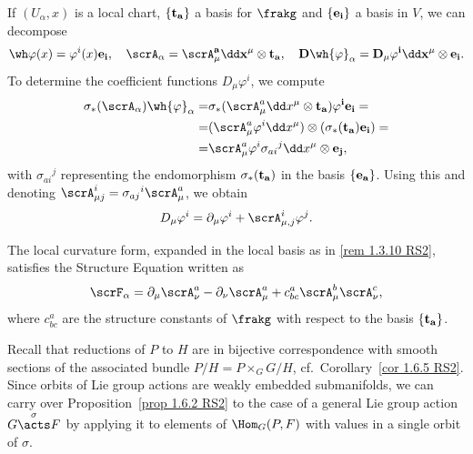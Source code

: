 \begin{rem}\label{rem 1.4.14 RS2}
    If $(U_\alpha,x)$ is a local chart, $\{\bf{t}_a\}$ a basis for $\frakg$ and $\{\bf{e}_i\}$ a basis in $V$, we can decompose
    \[\wh\varphi(x)=\varphi^i(x)\bf{e}_i,\quad \scrA_\alpha=\scrA_\mu^a\dd x^\mu\otimes \bf{t}_a,\quad D\wh{\varphi}_\alpha=D_\mu \varphi^i\dd x^\mu\otimes \bf{e}_i.\]
    To determine the coefficient functions $D_\mu\varphi^i$, we compute
    \begin{align}
        \sigma_\ast(\scrA_\alpha)\wh{\varphi}_\alpha=&\sigma_\ast(\scrA_\mu^a\dd x^\mu\otimes\bf{t}_a)\varphi^i\bf{e}_i=\\
        =&(\scrA_\mu^a\varphi^i\dd x^\mu)\otimes(\sigma_\ast(\bf{t}_a)\bf{e}_i)=\\
        =&\scrA_\mu^a\varphi^i\sigma_{ai}{}^j\dd x^\mu\otimes \bf{e}_j,
    \end{align}
    with $\sigma_{ai}{}^j$ representing the endomorphism $\sigma_\ast(\bf{t}_a)$ in the basis $\{\bf{e}_a\}$. Using this and denoting $\scrA_{\mu j}^i=\sigma_{aj}{}^i\scrA_\mu^a$, we obtain 
    \[D_\mu\varphi^i=\partial_\mu\varphi^i+\scrA_{\mu,j}^i \varphi^j.\]
\end{rem}

\begin{rem}
    The local curvature form, expanded in the local basis as in \ref{rem 1.3.10 RS2}, satisfies the Structure Equation written as
    \[\scrF_\alpha=\partial_\mu \scrA_\nu^a-\partial_\nu\scrA_\mu^a+c^a_{bc}\scrA_\mu^b\scrA_\nu^c,\]
    where $c^a_{bc}$ are the structure constants of $\frakg$ with respect to the basis $\{\bf{t}_a\}$.
\end{rem}

Recall that reductions of $P$ to $H$ are in bijective correspondence with smooth sections of the associated bundle $P\slash H=P\times_G G\slash H$, cf.\ Corollary~\ref{cor 1.6.5 RS2}. Since orbits of Lie group actions are weakly embedded submanifolds, we can carry over Proposition~\ref{prop 1.6.2 RS2} to the case of a general Lie group action $G\overset{\sigma}{\acts}F$ by applying it to elements of $\Hom_G(P,F)$ with values in a single orbit of $\sigma$.


